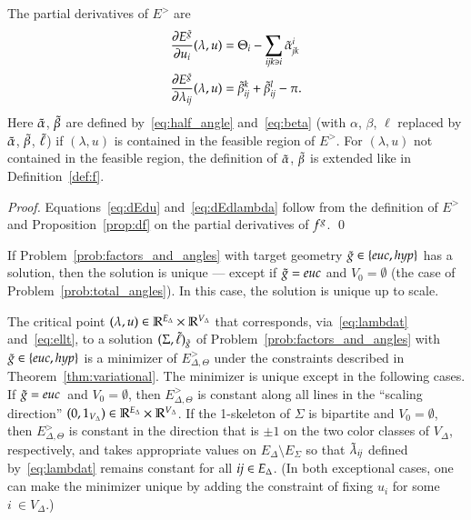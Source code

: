 \documentclass[Thesis]{subfiles}
\begin{document}
\begin{proposition}
  \label{prop:dE}
  The partial derivatives of $E^{\gt}$ are
  \begin{align}
    \label{eq:dEdu}
    \frac{\partial E^{\tilde{g}}}{\partial u_i}(\lambda,u) &= \Theta_i - \sum_{{\it
      ijk}\ni i}\tilde{\alpha}_{\it jk}^i \\
    \label{eq:dEdlambda}
    \frac{\partial E^{\tilde{g}}}{\partial \lambda_{\it ij}}(\lambda,u) &= \tilde{\beta}_{\it ij}^k + \tilde{\beta}_{\it ij}^l -\pi.
  \end{align}
  Here $\tilde{\alpha}$, $\tilde{\beta}$ are defined by~\eqref{eq:half_angle}
  and~\eqref{eq:beta} (with $\alpha$, $\beta$, $\ell$ replaced by
  $\tilde{\alpha}$, $\tilde{\beta}$, $\tilde{\ell}$) if\/ $(\lambda,u)$ is contained in the
  feasible region of $E^{\gt}$. For\/ $(\lambda,u)$ not contained in
  the feasible region, the definition of $\tilde{\alpha}$, $\tilde{\beta}$ is
  extended like in Definition~\ref{def:f}.
\end{proposition}

\begin{proof}
  Equations~\eqref{eq:dEdu} and~\eqref{eq:dEdlambda} follow from the
  definition of $E^{\gt}$ and Proposition~\ref{prop:df} on the partial
  derivatives of $f^{g}$.
  \qed
\end{proof}

\begin{theorem}
  \label{thm:uniqueness}
  If Problem~\ref{prob:factors_and_angles} with target geometry 
  $\gt\in\{\euc,\hyp\}$
  has a solution, then the solution is unique --- except if $\gt=\euc$
  and $V_{0}=\emptyset$ (the case of
  Problem~\ref{prob:total_angles}). In this case, the solution is
  unique up to scale.

  The critical point\/ $(\lambda,
  u)\in\mathbb R^{E_{\Delta}}\times\mathbb R^{V_{\Delta}}$ that corresponds,
  via~\eqref{eq:lambdat} and~\eqref{eq:ellt}, to a solution
  $(\Sigma,\tilde{\ell})_{\tilde{g}}$ of Problem~\ref{prob:factors_and_angles} with
  $\gt\in\{\euc,\hyp\}$ is a minimizer of $E^{\gt}_{\Delta,\Theta}$
  under the constraints described in
  Theorem~\ref{thm:variational}. The minimizer is unique except in the
  following cases. If $\gt=\euc$\, and $V_{0}=\emptyset$, then
  $E^{\gt}_{\Delta,\Theta}$ is constant along all lines in the
  ``scaling direction''
  $(0,1_{V_{\Delta}})\in\mathbb R^{E_{\Delta}}\times\mathbb R^{V_{\Delta}}$. If the
  1-skeleton of\/ $\Sigma$ is bipartite and $V_{0}=\emptyset$, then
  $E^{\gt}_{\Delta,\Theta}$ is constant in the direction that is $\pm
  1$ on the two color classes of $V_{\Delta}$, respectively, and takes
  appropriate values on $E_{\Delta}\setminus E_{\Sigma}$ so that
  $\tilde{\lambda}_{\it ij}$ defined by~\eqref{eq:lambdat} remains constant
  for all ${\it ij}\in E_{\Delta}$. (In both exceptional cases, one
  can make the minimizer unique by adding the constraint of fixing
  $u_{i}$ for some $i~\in V_{\Delta}$.)
\end{theorem}
\end{document}
